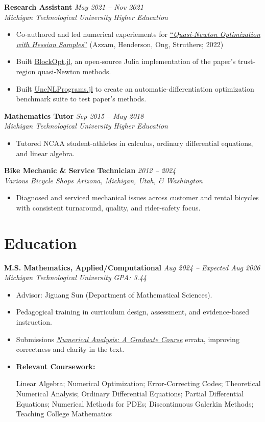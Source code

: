 \documentclass[10pt,letterpaper]{article}
\newcommand{\resumeItem}[1]{\item \small #1}
\newcommand{\resumeLink}[2]{\href{#1}{#2}}
\newcommand{\resumeSubheading}[4]{%
  \textbf{#1} \hfill \small{\textit{#2}}\\
  \small{\textit{#3}} \hfill \small{\textit{#4}}\par
}
\newenvironment{courselist}[1][Relevant Coursework]{%
  \begin{minipage}[t]{\linewidth}%
    \textbf{#1:} \ignorespaces
}{%
  \end{minipage}%
}
\begin{document}
\resumeSubheading{Research Assistant}{May 2021 -- Nov 2021}{Michigan Technological University}{Higher Education}
\begin{itemize}
  \resumeItem{Co-authored and led numerical experiements for \resumeLink{https://arxiv.org/abs/2201.02608}{``\emph{Quasi-Newton Optimization with Hessian Samples}''} (Azzam, Henderson, Ong, Struthers; 2022)}
  \resumeItem{Built \resumeLink{https://github.com/danphenderson/BlockOpt.jl}{BlockOpt.jl}, an open-source Julia implementation of the paper's trust-region quasi-Newton methods.}
  \resumeItem{Built \resumeLink{https://github.com/danphenderson/UncNLPrograms.jl}{UncNLPrograms.jl} to create an automatic-differentiation optimization benchmark suite to test paper's methods.}
\end{itemize}

\resumeSubheading{Mathematics Tutor}{Sep 2015 -- May 2018}{Michigan Technological University}{Higher Education}
\begin{itemize}
  \resumeItem{Tutored NCAA student-athletes in calculus, ordinary differential equations, and linear algebra.}
\end{itemize}

\resumeSubheading{Bike Mechanic \& Service Technician}{2012 -- 2024}{Various Bicycle Shops}{Arizona, Michigan, Utah, \& Washington}
\begin{itemize}
  \resumeItem{Diagnosed and serviced mechanical issues across customer and rental bicycles with consistent turnaround, quality, and rider-safety focus.}
\end{itemize}

\newpage
\section*{Education}
\resumeSubheading{M.S. Mathematics, Applied/Computational}{Aug 2024 -- Expected Aug 2026}{Michigan Technological University}{GPA: 3.44}
\begin{itemize}
  \resumeItem{Advisor: Jiguang Sun (Department of Mathematical Sciences).}
  \resumeItem{Pedagogical training in curriculum design, assessment, and evidence-based instruction.}
  \resumeItem{Submissions \resumeLink{https://homepage.divms.uiowa.edu/~dstewart/978-3-031-08120-0_Cover_PrintPDF.pdf}{\emph{Numerical Analysis: A Graduate Course}} errata, improving correctness and clarity in the text.}
  \resumeItem{
  \begin{courselist}
    Linear Algebra; Numerical Optimization; Error-Correcting Codes; Theoretical Numerical Analysis; Ordinary Differential Equations; Partial Differential Equations; Numerical Methods for PDEs; Discontinuous Galerkin Methods; Teaching College Mathematics
  \end{courselist}}
\end{itemize}
\end{document}
